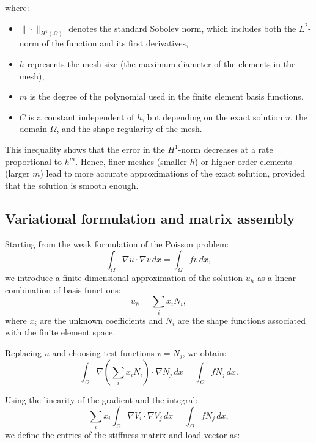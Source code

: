 \documentclass[12pt]{article}
\begin{document}
where:
\begin{itemize}
    \item \( \| \cdot \|_{H^1(\Omega)} \) denotes the standard Sobolev norm, which includes both the \( L^2 \)-norm of the function and its first derivatives,
    \item \( h \) represents the mesh size (the maximum diameter of the elements in the mesh),
    \item \( m \) is the degree of the polynomial used in the finite element basis functions,
    \item \( C \) is a constant independent of \( h \), but depending on the exact solution \( u \), the domain \( \Omega \), and the shape regularity of the mesh.
\end{itemize}

This inequality shows that the error in the \( H^1 \)-norm decreases at a rate proportional to \( h^m \). Hence, finer meshes (smaller \( h \)) or higher-order elements (larger \( m \)) lead to more accurate approximations of the exact solution, provided that the solution is smooth enough.

\subsection{Variational formulation and matrix assembly}

Starting from the weak formulation of the Poisson problem:
\begin{equation}
\int_\Omega \nabla u \cdot \nabla v \, dx = \int_\Omega f v \, dx,
\end{equation}
we introduce a finite-dimensional approximation of the solution \( u_h \) as a linear combination of basis functions:
\begin{equation}
u_h = \sum_i x_i N_i,
\end{equation}
where \( x_i \) are the unknown coefficients and \( N_i \) are the shape functions associated with the finite element space.

Replacing \( u \) and choosing test functions \( v = N_j \), we obtain:
\begin{equation}
\int_\Omega \nabla \left( \sum_i x_i N_i \right) \cdot \nabla N_j \, dx = \int_\Omega f N_j \, dx.
\end{equation}

Using the linearity of the gradient and the integral:
\begin{equation}
\sum_i x_i \int_\Omega \nabla V_i \cdot \nabla V_j \, dx = \int_\Omega f N_j \, dx,
\end{equation}
we define the entries of the stiffness matrix and load vector as:
\end{document}
